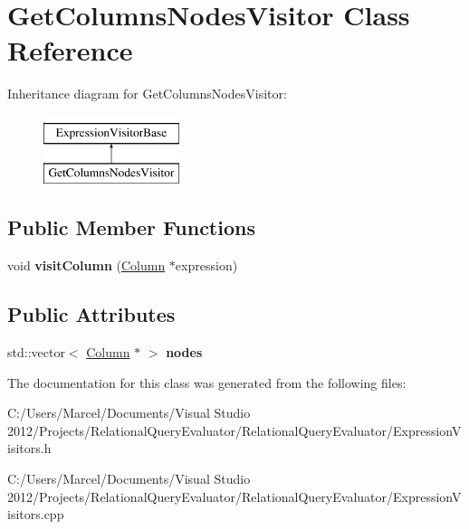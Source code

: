 \hypertarget{class_get_columns_nodes_visitor}{\section{Get\+Columns\+Nodes\+Visitor Class Reference}
\label{class_get_columns_nodes_visitor}
}
Inheritance diagram for Get\+Columns\+Nodes\+Visitor\+:\begin{figure}[H]
\begin{center}
\leavevmode
\includegraphics[height=2.000000cm]{class_get_columns_nodes_visitor}
\end{center}
\end{figure}
\subsection*{Public Member Functions}
\begin{DoxyCompactItemize}
\item 
\hypertarget{class_get_columns_nodes_visitor_adcd58020e010392df2b543b6a4bbc46b}{void {\bfseries visit\+Column} (\hyperlink{class_column}{Column} $\ast$expression)}\label{class_get_columns_nodes_visitor_adcd58020e010392df2b543b6a4bbc46b}

\end{DoxyCompactItemize}
\subsection*{Public Attributes}
\begin{DoxyCompactItemize}
\item 
\hypertarget{class_get_columns_nodes_visitor_ac68ee0c1090596d4e25a5dc5a478533b}{std\+::vector$<$ \hyperlink{class_column}{Column} $\ast$ $>$ {\bfseries nodes}}\label{class_get_columns_nodes_visitor_ac68ee0c1090596d4e25a5dc5a478533b}

\end{DoxyCompactItemize}


The documentation for this class was generated from the following files\+:\begin{DoxyCompactItemize}
\item 
C\+:/\+Users/\+Marcel/\+Documents/\+Visual Studio 2012/\+Projects/\+Relational\+Query\+Evaluator/\+Relational\+Query\+Evaluator/Expression\+Visitors.\+h\item 
C\+:/\+Users/\+Marcel/\+Documents/\+Visual Studio 2012/\+Projects/\+Relational\+Query\+Evaluator/\+Relational\+Query\+Evaluator/Expression\+Visitors.\+cpp\end{DoxyCompactItemize}
